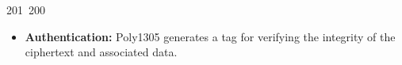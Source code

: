 201~200~\documentclass{article}
\begin{document}
\begin{itemize}
	                                                                                                                                                                                                                                                                                                	                                                                                                                                        	    	                                                                                                	                                                                                                                                                                                                                                                                                                                                	                                                                        	                                                                        	                                                                                                                                        	                                                                                                                                                                                                                        	                                                                                                                            	                                                                	                                                                                                    \item \textbf{Authentication:} Poly1305 generates a tag for verifying the integrity of the ciphertext and associated data.

\end{itemize}
\end{document}
